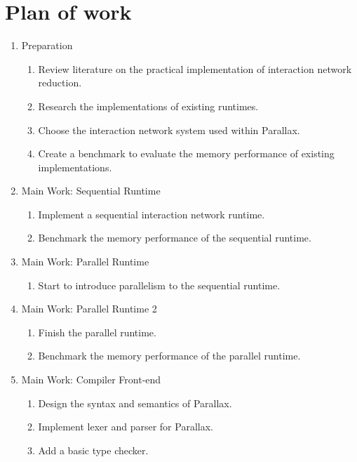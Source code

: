 \documentclass{article}
\newcommand{\Name}{Parallax}
\begin{document}
\section{Plan of work}

\begin{enumerate}
    \item Preparation
    \begin{enumerate}
        \item Review literature on the practical implementation of interaction network reduction.
        \item Research the implementations of existing runtimes.
        \item Choose the interaction network system used within \Name{}.
        \item Create a benchmark to evaluate the memory performance of existing implementations.
    \end{enumerate}
    \item Main Work: Sequential Runtime
    \begin{enumerate}
        \item Implement a sequential interaction network runtime.
        \item Benchmark the memory performance of the sequential runtime.
    \end{enumerate}
    \item Main Work: Parallel Runtime
    \begin{enumerate}
        \item Start to introduce parallelism to the sequential runtime.
    \end{enumerate}
    \item Main Work: Parallel Runtime 2
    \begin{enumerate}
        \item Finish the parallel runtime.
        \item Benchmark the memory performance of the parallel runtime.
    \end{enumerate}
    \item Main Work: Compiler Front-end
    \begin{enumerate}
        \item Design the syntax and semantics of \Name{}.
        \item Implement lexer and parser for \Name{}.
        \item Add a basic type checker.

\end{enumerate}
\end{enumerate}
\end{document}
